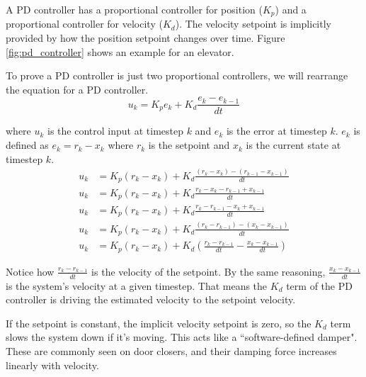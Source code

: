 A PD controller has a proportional controller for position ($K_p$) and a
proportional controller for velocity ($K_d$). The velocity \gls{setpoint} is
implicitly provided by how the position \gls{setpoint} changes over time. Figure
\ref{fig:pd_controller} shows an example for an elevator.

To prove a PD controller is just two proportional controllers, we will rearrange
the equation for a PD controller.
\begin{equation*}
  u_k = K_p e_k + K_d \frac{e_k - e_{k-1}}{dt}
\end{equation*}

where $u_k$ is the \gls{control input} at timestep $k$ and $e_k$ is the
\gls{error} at timestep $k$. $e_k$ is defined as $e_k = r_k - x_k$ where $r_k$
is the \gls{setpoint} and $x_k$ is the current \gls{state} at timestep $k$.
\begin{align*}
  u_k &= K_p (r_k - x_k) + K_d \frac{(r_k - x_k) - (r_{k-1} - x_{k-1})}{dt} \\
  u_k &= K_p (r_k - x_k) + K_d \frac{r_k - x_k - r_{k-1} + x_{k-1}}{dt} \\
  u_k &= K_p (r_k - x_k) + K_d \frac{r_k - r_{k-1} - x_k + x_{k-1}}{dt} \\
  u_k &= K_p (r_k - x_k) + K_d \frac{(r_k - r_{k-1}) - (x_k - x_{k-1})}{dt} \\
  u_k &= K_p (r_k - x_k) + K_d \left(\frac{r_k - r_{k-1}}{dt} -
    \frac{x_k - x_{k-1}}{dt}\right)
\end{align*}

Notice how $\frac{r_k - r_{k-1}}{dt}$ is the velocity of the \gls{setpoint}. By
the same reasoning, $\frac{x_k - x_{k-1}}{dt}$ is the \gls{system}'s velocity at
a given timestep. That means the $K_d$ term of the PD controller is driving the
estimated velocity to the \gls{setpoint} velocity.

If the \gls{setpoint} is constant, the implicit velocity \gls{setpoint} is zero,
so the $K_d$ term slows the \gls{system} down if it's moving. This acts like a
``software-defined damper". These are commonly seen on door closers, and their
damping force increases linearly with velocity.
